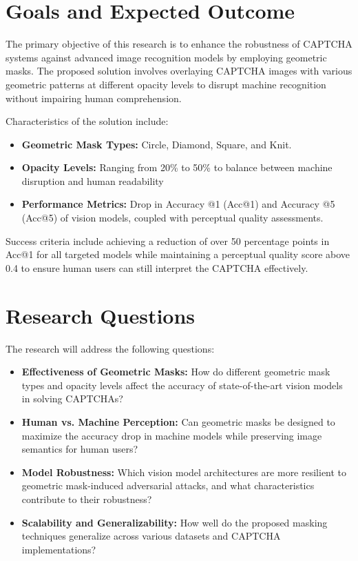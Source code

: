 \documentclass[a4paper,11pt]{article}
\begin{document}
\section*{Goals and Expected Outcome}

The primary objective of this research is to enhance the robustness of CAPTCHA systems against advanced image recognition models by employing geometric masks. The proposed solution involves overlaying CAPTCHA images with various geometric patterns at different opacity levels to disrupt machine recognition without impairing human comprehension.

Characteristics of the solution include:

\begin{itemize}
    \item \textbf{Geometric Mask Types:} Circle, Diamond, Square, and Knit.
    \item \textbf{Opacity Levels:} Ranging from 20\% to 50\% to balance between machine disruption and human readability
    \item \textbf{Performance Metrics:} Drop in Accuracy @1 (Acc@1) and Accuracy @5 (Acc@5) of vision models, coupled with perceptual quality assessments.
\end{itemize}

Success criteria include achieving a reduction of over 50 percentage points in Acc@1 for all targeted models while maintaining a perceptual quality score above 0.4 to ensure human users can still interpret the CAPTCHA effectively.

\section*{Research Questions}

The research will address the following questions:

\begin{itemize}
    \item \textbf{Effectiveness of Geometric Masks:} How do different geometric mask types and opacity levels affect the accuracy of state-of-the-art vision models in solving CAPTCHAs?
    \item \textbf{Human vs. Machine Perception:} Can geometric masks be designed to maximize the accuracy drop in machine models while preserving image semantics for human users?
    \item \textbf{Model Robustness:} Which vision model architectures are more resilient to geometric mask-induced adversarial attacks, and what characteristics contribute to their robustness?
    \item \textbf{Scalability and Generalizability:} How well do the proposed masking techniques generalize across various datasets and CAPTCHA implementations?
\end{itemize}
\end{document}
